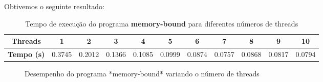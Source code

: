 \documentclass[a4paper, 12pt]{article}
\begin{document}
	Obtivemos o seguinte resultado:
		
	\begin{table}[h]
		\centering
		\begin{tabular}{|c|c|c|c|c|c|c|c|c|c|c|}
			\hline
			\textbf{Threads} & 1 & 2 & 3 & 4 & 5 & 6 & 7 & 8 & 9 & 10 \\
			\hline
			\textbf{Tempo (s)} & 0.3745 & 0.2012 & 0.1366 & 0.1085 & 0.0999 & 0.0874 & 0.0757 & 0.0868 & 0.0817 & 0.0794 \\
			\hline
		\end{tabular}
		\caption{Tempo de execução do programa \textbf{memory-bound} para diferentes números de threads}
		\label{tab:memory-bound}
	\end{table}
	
	\begin{figure}[h]
		\centering
		\caption{Desempenho do programa *memory-bound* variando o número de threads}
		\label{fig:memory-bound}
	\end{figure}
	
	
	
\end{document}
